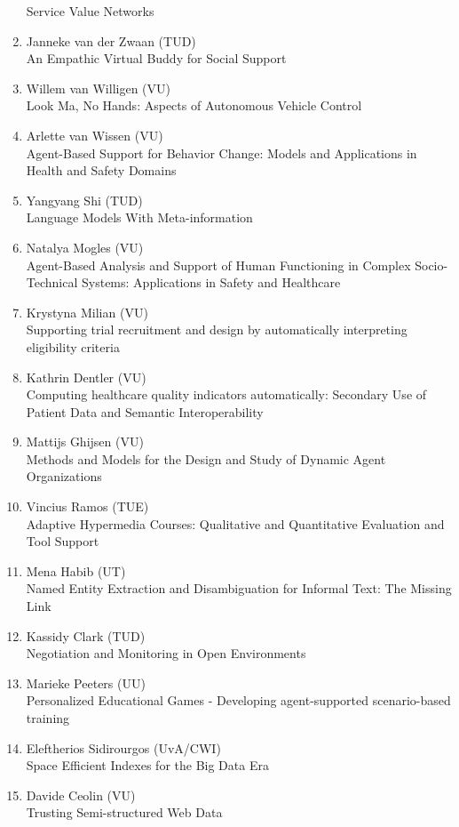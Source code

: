 \begin{multicols}{2}
\begin{scriptsize}
\begin{enumerate}[label=\textbf{2014-\arabic*},leftmargin=0cm,itemindent=1.15cm,labelwidth=\itemindent,labelsep=0cm,align=left,noitemsep]
	Service Value Networks
\item Janneke van der Zwaan (TUD) \\
	An Empathic Virtual Buddy for Social Support
\item Willem van Willigen (VU)\\
	Look Ma, No Hands: Aspects of Autonomous Vehicle Control
\item Arlette van Wissen (VU) \\
	Agent-Based Support for Behavior Change: Models and Applications in Health and Safety Domains
\item Yangyang Shi (TUD)\\
	Language Models With Meta-information
\item Natalya Mogles (VU) \\
	Agent-Based Analysis and Support of Human Functioning in Complex Socio-Technical Systems: Applications in Safety and Healthcare
\item Krystyna Milian (VU)\\
	Supporting trial recruitment and design by automatically interpreting eligibility criteria
\item Kathrin Dentler (VU) \\
	Computing healthcare quality indicators automatically: Secondary Use of Patient Data and Semantic Interoperability
\item Mattijs Ghijsen (VU)\\
	Methods and Models for the Design and Study of Dynamic Agent Organizations
\item Vincius Ramos (TUE) \\
	Adaptive Hypermedia Courses: Qualitative and Quantitative Evaluation and Tool Support 
\item Mena Habib (UT)\\
	Named Entity Extraction and Disambiguation for Informal Text: The Missing Link 
\item Kassidy Clark (TUD) \\
	Negotiation and Monitoring in Open Environments
\item Marieke Peeters (UU)\\
	Personalized Educational Games - Developing agent-supported scenario-based training
\item Eleftherios Sidirourgos (UvA/CWI)\\
	Space Efficient Indexes for the Big Data Era
	
\item Davide Ceolin (VU)\\
	Trusting Semi-structured Web Data


\end{enumerate}
\end{scriptsize}
\end{multicols}
